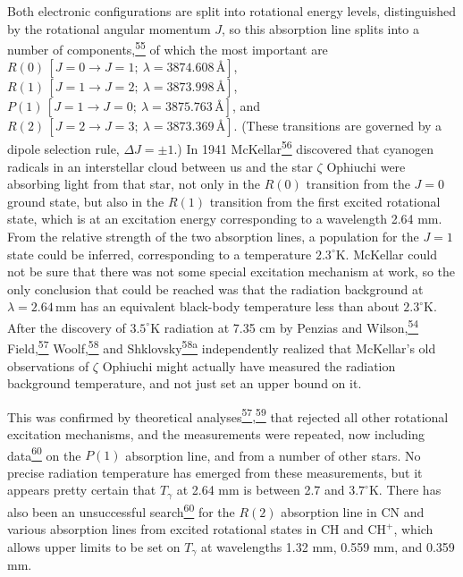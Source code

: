 Both electronic configurations are split into rotational energy levels,
distinguished by the rotational angular momentum \(J\), so this absorption line
splits into a number of components,\hyperref[ch15-ref-55]{\textsuperscript{55}}
of which the most important are
\(R(0)\,[J=0\to J=1;\ \lambda=3874.608\,\text{\AA}]\),
\(R(1)\,[J=1\to J=2;\ \lambda=3873.998\,\text{\AA}]\),
\(P(1)\,[J=1\to J=0;\ \lambda=3875.763\,\text{\AA}]\), and
\(R(2)\,[J=2\to J=3;\ \lambda=3873.369\,\text{\AA}]\). (These transitions
are governed by a dipole selection rule, \(\Delta J=\pm1\).) In 1941
McKellar\hyperref[ch15-ref-56]{\textsuperscript{56}} discovered that cyanogen
radicals in an interstellar cloud between us and the star \(\zeta\) Ophiuchi
were absorbing light from that star, not only in the \(R(0)\) transition from
the \(J=0\) ground state, but also in the \(R(1)\) transition from the first
excited rotational state, which is at an excitation energy corresponding to a
wavelength 2.64 mm. From the relative strength of the two absorption lines, a
population for the \(J=1\) state could be inferred, corresponding to a
temperature \(2.3^\circ\mathrm{K}\). McKellar could not be sure that there was
not some special excitation mechanism at work, so the only conclusion that
could be reached was that the radiation background at
\(\lambda=2.64\,\mathrm{mm}\) has an equivalent black-body temperature less
than about \(2.3^\circ\mathrm{K}\). After the discovery of
\(3.5^\circ\mathrm{K}\) radiation at 7.35 cm by Penzias and
Wilson,\hyperref[ch15-ref-54]{\textsuperscript{54}}
Field,\hyperref[ch15-ref-57]{\textsuperscript{57}}
Woolf,\hyperref[ch15-ref-58]{\textsuperscript{58}} and
Shklovsky\hyperref[ch15-ref-58a]{\textsuperscript{58a}} independently
realized that McKellar's old observations of \(\zeta\) Ophiuchi might actually
have measured the radiation background temperature, and not just set an upper
bound on it.



This was confirmed by theoretical
analyses\hyperref[ch15-ref-57]{\textsuperscript{57},}\hyperref[ch15-ref-59]{\textsuperscript{59}}
that rejected all other rotational excitation mechanisms, and the measurements
were repeated, now including data\hyperref[ch15-ref-60]{\textsuperscript{60}}
on the \(P(1)\) absorption line, and from a number of other stars. No precise
radiation temperature has emerged from these measurements, but it appears
pretty certain that \(T_\gamma\) at 2.64 mm is between 2.7 and
\(3.7^\circ\mathrm{K}\). There has also been an unsuccessful
search\hyperref[ch15-ref-60]{\textsuperscript{60}} for the \(R(2)\) absorption
line in CN and various absorption lines from excited rotational states in CH
and \(\mathrm{CH}^+\), which allows upper limits to be set on \(T_\gamma\) at
wavelengths 1.32 mm, 0.559 mm, and 0.359 mm.

